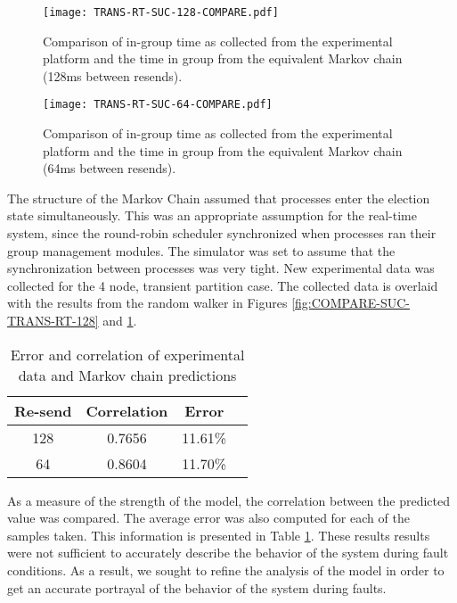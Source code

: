 \begin{figure}
\centering
\begin{minipage}{0.45\textwidth}
    \centering
    \texttt{[image: TRANS-RT-SUC-128-COMPARE.pdf]}
    \caption{Comparison of in-group time as collected from the experimental platform and the time in group from the equivalent Markov chain (128ms between resends).}
    \label{fig:COMPARE-SUC-TRANS-RT-128}
\end{minipage}%
\qquad
\begin{minipage}{0.45\textwidth}
    \centering
    \texttt{[image: TRANS-RT-SUC-64-COMPARE.pdf]}
    \caption{Comparison of in-group time as collected from the experimental platform and the time in group from the equivalent Markov chain (64ms between resends).}
    \label{fig:COMPARE-SUC-TRANS-RT-64}
\end{minipage}
\end{figure}

The structure of the Markov Chain assumed that processes enter the election state simultaneously.
This was an appropriate assumption for the real-time system, since the round-robin scheduler synchronized when processes ran their group management modules.
The simulator was set to assume that the synchronization between processes was very tight.
New experimental data was collected for the 4 node, transient partition case.
The collected data is overlaid with the results from the random walker in Figures \ref{fig:COMPARE-SUC-TRANS-RT-128} and \ref{fig:COMPARE-SUC-TRANS-RT-64}.

\begin{table}
\caption{Error and correlation of experimental data and Markov chain predictions}
\label{tab:STAT-DATA}
\centering
\begin{tabular}{|c||c|c|c|}
\hline
Re-send & Correlation & Error \\ \hline
128 & 0.7656 & 11.61\% \\ \hline
64 & 0.8604 & 11.70\% \\ \hline
\end{tabular}
\end{table}

As a measure of the strength of the model, the correlation between the predicted value was compared.
The average error was also computed for each of the samples taken.
This information is presented in Table \ref{tab:STAT-DATA}.
These results results were not sufficient to accurately describe the behavior of the system during fault conditions.
As a result, we sought to refine the analysis of the model in order to get an accurate portrayal of the behavior of the system during faults.

